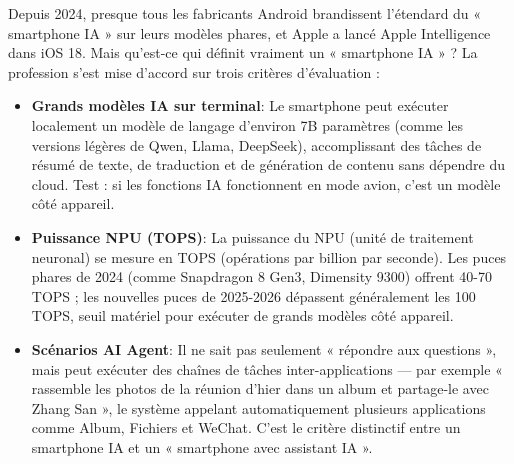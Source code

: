 


Depuis 2024, presque tous les fabricants Android brandissent l'étendard du « smartphone IA » sur leurs modèles phares, et Apple a lancé Apple Intelligence dans iOS 18. Mais qu'est-ce qui définit vraiment un « smartphone IA » ? La profession s'est mise d'accord sur trois critères d'évaluation :

\begin{itemize}
  \item \textbf{Grands modèles IA sur terminal}: Le smartphone peut exécuter localement un modèle de langage d'environ 7B paramètres (comme les versions légères de Qwen, Llama, DeepSeek), accomplissant des tâches de résumé de texte, de traduction et de génération de contenu sans dépendre du cloud. Test : si les fonctions IA fonctionnent en mode avion, c'est un modèle côté appareil.
  \item \textbf{Puissance NPU (TOPS)}: La puissance du NPU (unité de traitement neuronal) se mesure en TOPS (opérations par billion par seconde). Les puces phares de 2024 (comme Snapdragon 8 Gen3, Dimensity 9300) offrent 40-70 TOPS ; les nouvelles puces de 2025-2026 dépassent généralement les 100 TOPS, seuil matériel pour exécuter de grands modèles côté appareil.
  \item \textbf{Scénarios AI Agent}: Il ne sait pas seulement « répondre aux questions », mais peut exécuter des chaînes de tâches inter-applications — par exemple « rassemble les photos de la réunion d'hier dans un album et partage-le avec Zhang San », le système appelant automatiquement plusieurs applications comme Album, Fichiers et WeChat. C'est le critère distinctif entre un smartphone IA et un « smartphone avec assistant IA ».
\end{itemize}

